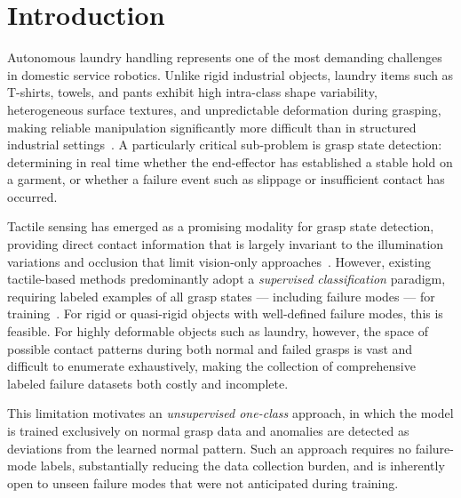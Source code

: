 \documentclass[pdflatex,sn-mathphys-num]{sn-jnl}%
\theoremstyle{thmstyleone}%
\theoremstyle{thmstyletwo}%
\theoremstyle{thmstylethree}%
\begin{document}

\maketitle

\section{Introduction}
\label{sec:intro}

Autonomous laundry handling represents one of the most demanding challenges in domestic service robotics. Unlike rigid industrial objects, laundry items such as T-shirts, towels, and pants exhibit high intra-class shape variability, heterogeneous surface textures, and unpredictable deformation during grasping, making reliable manipulation significantly more difficult than in structured industrial settings~\cite{Billard2019, Hamajima1996}. A particularly critical sub-problem is grasp state detection: determining in real time whether the end-effector has established a stable hold on a garment, or whether a failure event such as slippage or insufficient contact has occurred.

Tactile sensing has emerged as a promising modality for grasp state detection, providing direct contact information that is largely invariant to the illumination variations and occlusion that limit vision-only approaches~\cite{Calandra2018, Yan2022ICRA}. However, existing tactile-based methods predominantly adopt a \textit{supervised classification} paradigm, requiring labeled examples of all grasp states — including failure modes — for training~\cite{YGC2026, Cui2020, Funabashi2022}. For rigid or quasi-rigid objects with well-defined failure modes, this is feasible. For highly deformable objects such as laundry, however, the space of possible contact patterns during both normal and failed grasps is vast and difficult to enumerate exhaustively, making the collection of comprehensive labeled failure datasets both costly and incomplete.

This limitation motivates an \textit{unsupervised one-class} approach, in which the model is trained exclusively on normal grasp data and anomalies are detected as deviations from the learned normal pattern. Such an approach requires no failure-mode labels, substantially reducing the data collection burden, and is inherently open to unseen failure modes that were not anticipated during training.
\end{document}
